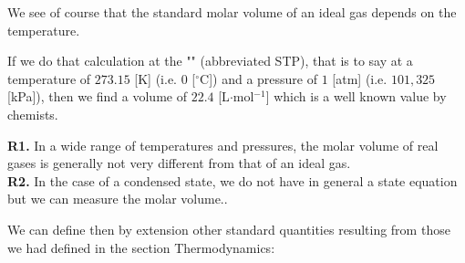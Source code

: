\begin{enumerate}
		We see of course that the standard molar volume of an ideal gas depends on the temperature.
		
		If we do that calculation at the "" (abbreviated STP), that is to say at a temperature of $273.15$ [K] (i.e. $0$ [$^\circ$C]) and a pressure of $1$ [atm] (i.e. $101,325$ [kPa]), then we find a volume of $22.4$ [L$\cdot$mol$^{-1}$] which is a well known value by chemists.
	\end{enumerate}
	
	\begin{tcolorbox}[title=Remarks,colframe=black,arc=10pt]
	\textbf{R1.} In a wide range of temperatures and pressures, the molar volume of real gases is generally not very different from that of an ideal gas.\\
	
	\textbf{R2.} In the case of a condensed state, we do not have in general a state equation but we can measure the molar volume..
	\end{tcolorbox}
	We can define then by extension other standard quantities resulting from those we had defined in the section Thermodynamics:
